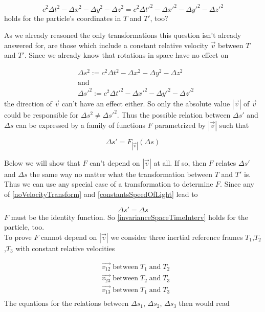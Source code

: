 \documentclass{article}
\begin{document}
\begin{equation} \label{invarianceSpaceTimeInterv}
    c^2\Delta t^2 - \Delta x^2 - \Delta y^2 - \Delta z^2 = c^2\Delta t'^2 - \Delta x'^2 - \Delta y'^2 - \Delta z'^2
\end{equation}
holds for the particle's coordinates in $T$ and $T'$, too?

As we already reasoned the only transformations this question isn't already answered for, are those which include a constant relative velocity $\vec{v}$ between $T$ and $T'$.
Since we already know that rotations in space have no effect on

\begin{align*}
    &\Delta s^2 := c^2\Delta t^2 - \Delta x^2 - \Delta y^2 - \Delta z^2 \\
    &\text{and} \\
    &\Delta s'^2 := c^2\Delta t'^2 - \Delta x'^2 - \Delta y'^2 - \Delta z'^2
\end{align*}
the direction of $\vec{v}$ can't have an effect either. So only the absolute value $|\vec{v}|$ of $\vec{v}$ could be responsible for $\Delta s^2 \neq \Delta s'^2 $.
Thus the possible relation between $\Delta s'$ and $\Delta s$ can be expressed by a family of functions $F$ parametrized by $|\vec{v}|$ such that

\begin{equation}
    \Delta s' = F_{|\vec{v}|} (\Delta s)
\end{equation}

Below we will show that $F$ can't depend on $|\vec{v}|$ at all.
If so, then $F$ relates $\Delta s'$ and $\Delta s$ the same way no matter what the transformation between $T$ and $T'$ is.
Thus we can use any special case of a transformation to determine $F$.
Since any of \ref{noVelocityTransform} and \ref{constantsSpeedOfLight} lead to

\begin{equation}
    \Delta s' = \Delta s
\end{equation}
$F$ must be the identity function.
So \ref{invarianceSpaceTimeInterv} holds for the particle, too.
\\


To prove $F$ cannot depend on $|\vec{v}|$ we consider three inertial reference frames $T_1$,$T_2$,$T_3$ with constant relative velocities

\begin{align*}
    &\vec{v_{12}} \; \text{between} \; T_1 \; \text{and} \; T_2 \\
    &\vec{v_{23}} \; \text{between} \; T_2 \; \text{and} \; T_3 \\
    &\vec{v_{13}} \; \text{between} \; T_1 \; \text{and} \; T_3 \\
\end{align*}
The equations for the relations between $\Delta s_1$, $\Delta s_2$, $\Delta s_3$ then would read
\end{document}
